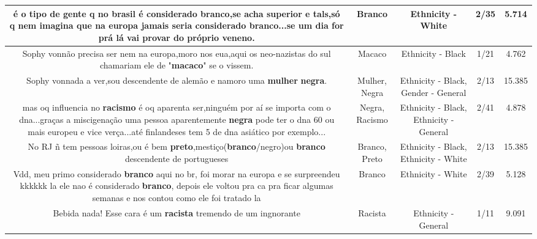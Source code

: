 \documentclass[11pt]{article}
\newlength\mylength
\begin{document}
\begin{center}
\begin{longtable}{|C{.65\mylength}|C{.30\mylength}|C{.12\mylength}|C{.12\mylength}|C{.12\mylength}|}
  \small é o tipo de gente q no brasil é considerado \textbf{branco},se acha superior e tals,só q nem imagina que na europa jamais seria considerado \textbf{branco}...se um dia for prá lá vai provar do próprio veneno.\normalsize   & Branco & Ethnicity - White & 2/35 & 5.714 \\  \hline
  \small Sophy vonnão precisa ser nem na europa,moro nos eua,aqui os neo-nazistas do sul chamariam ele de "\textbf{macaco}" se o vissem.\normalsize   & Macaco & Ethnicity - Black & 1/21 & 4.762 \\  \hline
  \small Sophy vonnada a ver,sou descendente de alemão e namoro uma \textbf{mulher} \textbf{negra}.\normalsize   & Mulher, Negra & Ethnicity - Black, Gender - General & 2/13 & 15.385 \\  \hline
  \small mas oq influencia no \textbf{racismo} é oq aparenta ser,ninguém por aí se importa com o dna...graças a miscigenação uma pessoa aparentemente \textbf{negra} pode ter o dna 60  ou mais europeu e vice verça...até finlandeses tem 5 de dna asiático por exemplo...\normalsize   & Negra, Racismo & Ethnicity - Black, Ethnicity - General & 2/41 & 4.878 \\  \hline
  \small No RJ ñ tem pessoas loiras,ou é bem \textbf{preto},mestiço(\textbf{branco}/negro)ou \textbf{branco} descendente de portugueses\normalsize   & Branco, Preto & Ethnicity - Black, Ethnicity - White & 2/13 & 15.385 \\  \hline
  \small Vdd, meu primo considerado \textbf{branco} aqui no br, foi morar na europa e se surpreendeu kkkkkk la ele nao é considerado \textbf{branco}, depois ele voltou pra ca pra ficar algumas semanas e nos contou como ele foi tratado la\normalsize   & Branco & Ethnicity - White & 2/39 & 5.128 \\  \hline
  \small Bebida nada! Esse cara é um \textbf{racista} tremendo de um  ingnorante\normalsize   & Racista & Ethnicity - General & 1/11 & 9.091 \\  \hline

\end{longtable}
\end{center}
\end{document}
